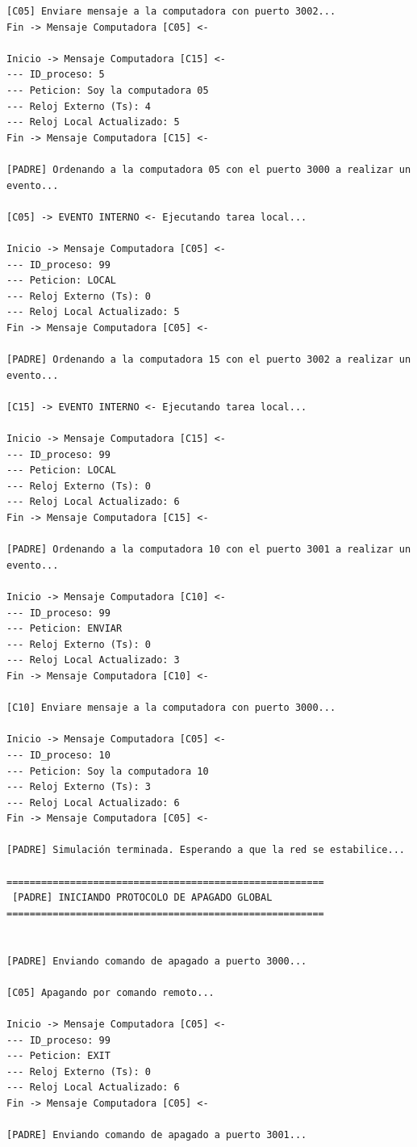 \begin{lstlisting}[style=estiloC]
[C05] Enviare mensaje a la computadora con puerto 3002...
Fin -> Mensaje Computadora [C05] <-

Inicio -> Mensaje Computadora [C15] <-
--- ID_proceso: 5
--- Peticion: Soy la computadora 05
--- Reloj Externo (Ts): 4
--- Reloj Local Actualizado: 5
Fin -> Mensaje Computadora [C15] <-

[PADRE] Ordenando a la computadora 05 con el puerto 3000 a realizar un evento...

[C05] -> EVENTO INTERNO <- Ejecutando tarea local...

Inicio -> Mensaje Computadora [C05] <-
--- ID_proceso: 99
--- Peticion: LOCAL
--- Reloj Externo (Ts): 0
--- Reloj Local Actualizado: 5
Fin -> Mensaje Computadora [C05] <-

[PADRE] Ordenando a la computadora 15 con el puerto 3002 a realizar un evento...

[C15] -> EVENTO INTERNO <- Ejecutando tarea local...

Inicio -> Mensaje Computadora [C15] <-
--- ID_proceso: 99
--- Peticion: LOCAL
--- Reloj Externo (Ts): 0
--- Reloj Local Actualizado: 6
Fin -> Mensaje Computadora [C15] <-

[PADRE] Ordenando a la computadora 10 con el puerto 3001 a realizar un evento...

Inicio -> Mensaje Computadora [C10] <-
--- ID_proceso: 99
--- Peticion: ENVIAR
--- Reloj Externo (Ts): 0
--- Reloj Local Actualizado: 3
Fin -> Mensaje Computadora [C10] <-

[C10] Enviare mensaje a la computadora con puerto 3000...

Inicio -> Mensaje Computadora [C05] <-
--- ID_proceso: 10
--- Peticion: Soy la computadora 10
--- Reloj Externo (Ts): 3
--- Reloj Local Actualizado: 6
Fin -> Mensaje Computadora [C05] <-

[PADRE] Simulación terminada. Esperando a que la red se estabilice...

=======================================================
 [PADRE] INICIANDO PROTOCOLO DE APAGADO GLOBAL 
=======================================================


[PADRE] Enviando comando de apagado a puerto 3000...

[C05] Apagando por comando remoto...

Inicio -> Mensaje Computadora [C05] <-
--- ID_proceso: 99
--- Peticion: EXIT
--- Reloj Externo (Ts): 0
--- Reloj Local Actualizado: 6
Fin -> Mensaje Computadora [C05] <-

[PADRE] Enviando comando de apagado a puerto 3001...


\end{lstlisting}
